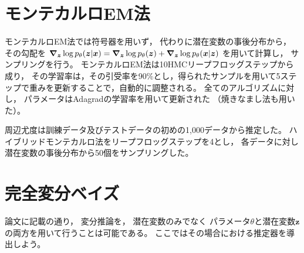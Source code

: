 \documentclass[dvipdfmx, fleqn]{jsarticle}
\begin{document}
\section{モンテカルロEM法}

モンテカルロEM法では符号器を用いず，
代わりに潜在変数の事後分布から，
その勾配を
\(\grad_{\bm{z}} \log{p_{\theta} (\bm{z} | \bm{x})} = \grad_{\bm{z}} \log{p_{\theta} (\bm{z})} + \grad_{\bm{z}} \log{p_{\theta} (\bm{x} | \bm{z})}\)
を用いて計算し，
サンプリングを行う。
モンテカルロEM法は10HMCリープフロッグステップから成り，
その学習率は，その引受率を90{\%}とし，得られたサンプルを用いて5ステップで重みを更新することで，自動的に調整される。
全てのアルゴリズムに対し，
パラメータはAdagradの学習率を用いて更新された
（焼きなまし法も用いた）。

周辺尤度は訓練データ及びテストデータの初めの1,000データから推定した。
ハイブリッドモンテカルロ法をリープフロッグステップを4とし，
各データに対し潜在変数の事後分布から50個をサンプリングした。



\section{完全変分ベイズ}

論文に記載の通り，
変分推論を，
潜在変数のみでなく
パラメータ\(\theta\)と潜在変数\(\bm{z}\)の両方を用いて行うことは可能である。
ここではその場合における推定器を導出しよう。
\end{document}
